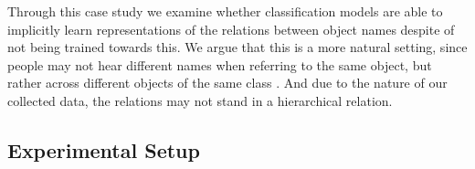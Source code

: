 Through this case study we examine whether classification models are able to implicitly learn representations of the relations between object names despite of not being trained towards this. 
We argue that this is a more natural setting, since people may not hear different names when referring to the same object, but rather across different objects of the same class . 
And due to the nature of our collected data, the relations may not stand in a hierarchical relation. 



\subsection{Experimental Setup}
